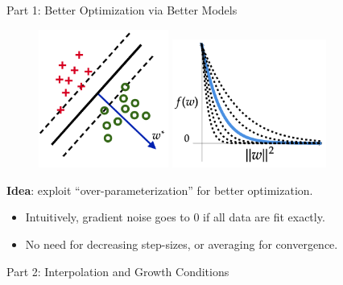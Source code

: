 \documentclass[mathserif,notheorems, hyperref={colorlinks, citecolor=blue, urlcolor=blue, linkcolor=blue}]{beamer}
\begin{document}
    \begin{frame}{Part 1: Better Optimization via Better Models}

        \begin{figure}
            \centering
            \includegraphics[width=0.38\textwidth]{figures/separable}
            \hspace{0.2em}
            \includegraphics[width=0.45\textwidth]{figures/loss_fn}
        \end{figure}
        \vspace{0.2em}

        \begin{center}
            \large \textbf{Idea}: exploit ``over-parameterization'' for better optimization.
        \end{center}
        \begin{itemize}
            \item Intuitively, gradient noise goes to $0$ if all data are fit exactly.
            \item No need for decreasing step-sizes, or averaging for convergence. 
        \end{itemize}

    \end{frame}



    \begin{frame}
       \begin{center}
          \huge Part 2: Interpolation and Growth Conditions 
       \end{center} 
    \end{frame}
\end{document}

